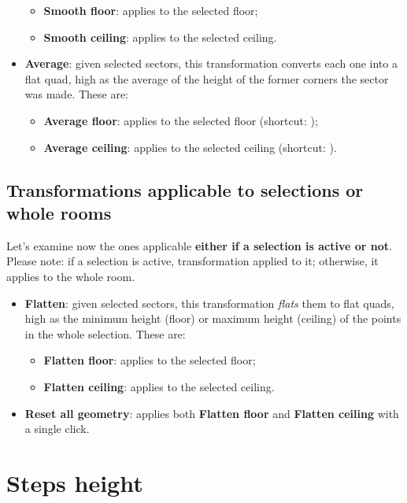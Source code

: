 \begin{itemize}
    \begin{itemize}
        \item \textbf{Smooth floor}: applies to the selected floor;
        \item \textbf{Smooth ceiling}: applies to the selected ceiling.
    \end{itemize}
    \item \textbf{Average}: given selected sectors, this transformation converts each one into a flat quad, high as the average of the height of the former corners the sector was made. These are:
    \begin{itemize}
        \item \textbf{Average floor}: applies to the selected floor (shortcut: );
        \item \textbf{Average ceiling}: applies to the selected ceiling (shortcut: ).
    \end{itemize}
\end{itemize}

\section{Transformations applicable to selections or whole rooms}

Let's examine now the ones applicable \textbf{either if a selection is active or not}. Please note: if a selection is active, transformation applied to it; otherwise, it applies to the whole room.

\begin{itemize}
    \item \textbf{Flatten}: given selected sectors, this transformation \emph{flats} them to flat quads, high as the minimum height (floor) or maximum height (ceiling) of the points in the whole selection. These are:
    \begin{itemize}
        \item \textbf{Flatten floor}: applies to the selected floor;
        \item \textbf{Flatten ceiling}: applies to the selected ceiling.
    \end{itemize}
    \item \textbf{Reset all geometry}: applies both \textbf{Flatten floor} and \textbf{Flatten ceiling} with a single click.
\end{itemize}

\chapter{Steps height}

